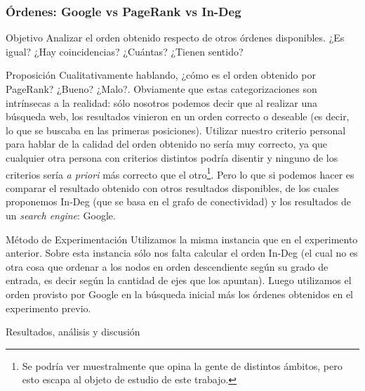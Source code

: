 \subsubsection{\'Ordenes: Google vs PageRank vs In-Deg}
\label{subsec:exp2}
\begin{LaTeXdescription}
    \item[Objetivo] Analizar el orden obtenido respecto de otros \'ordenes
        disponibles. ¿Es igual? ¿Hay coincidencias? ¿Cu\'antas? ¿Tienen
        sentido?\\

    \item[Proposici\'on] Cualitativamente hablando, ¿c\'omo es el orden obtenido
        por PageRank? ¿Bueno? ¿Malo?. Obviamente que estas categorizaciones son
        intr\'insecas a la realidad: s\'olo nosotros podemos decir que al
        realizar una b\'usqueda web, los resultados vinieron en un orden
        correcto o deseable (es decir, lo que se buscaba en las primeras
        posiciones).  Utilizar nuestro criterio personal para hablar de la
        calidad del orden obtenido no ser\'ia muy correcto, ya que cualquier
        otra persona con criterios distintos podr\'ia disentir y ninguno de los
        criterios ser\'ia \textit{a priori} m\'as correcto que el
        otro\footnote{Se podr\'ia ver muestralmente que opina la gente de
        distintos \'ambitos, pero esto escapa al objeto de estudio de este
        trabajo.}. Pero lo que si podemos hacer es comparar el resultado
        obtenido con otros resultados disponibles, de los cuales proponemos
        In-Deg (que se basa en el grafo de conectividad) y los resultados de un
        \textit{search engine}: Google.\\

    \item[M\'etodo de Experimentaci\'on] Utilizamos la misma instancia que en el
        experimento anterior. Sobre esta instancia s\'olo nos falta calcular el
        orden In-Deg (el cual no es otra cosa que ordenar a los nodos en orden
        descendiente seg\'un su grado de entrada, es decir seg\'un la cantidad
        de ejes que los apuntan). Luego utilizamos el orden provisto por Google
        en la b\'usqueda inicial m\'as los \'ordenes obtenidos en el experimento
        previo.\\

    \item[Resultados, an\'alisis y discusi\'on]
\end{LaTeXdescription}

